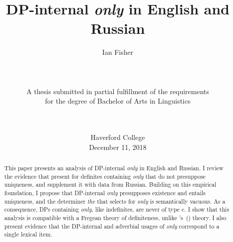 \documentclass{article}
\title{DP-internal \textit{only} in English and Russian}
\author{Ian Fisher \\ \\ \\ \\ A thesis submitted in partial fulfillment of the requirements \\ for the degree of Bachelor of Arts in Linguistics \\ \\ \\}  %
\date{Haverford College \\ December 11, 2018}
\newcommand{\citegen}[1]{\citeauthor{#1}'s~(\citeyear{#1})}
\begin{document}
\maketitle

\begin{abstract}
This paper presents an analysis of DP-internal \textit{only} in English and Russian. I review the evidence that \citet{cb2012b, cb2015} present for definites containing \textit{only} that do not presuppose uniqueness, and supplement it with data from Russian. Building on this empirical foundation, I propose that DP-internal \textit{only} presupposes existence and entails uniqueness, and the determiner \textit{the} that selects for \textit{only} is semantically vacuous. As a consequence, DPs containing \textit{only}, like indefinites, are never of type $e$. I show that this analysis is compatible with a Fregean theory of definiteness, unlike \citegen{cb2015} theory. I also present evidence that the DP-internal and adverbial usages of \textit{only} correspond to a single lexical item.
\end{abstract}

\newpage












\end{document}
